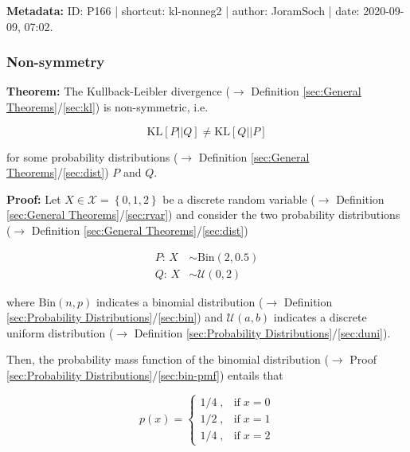 \documentclass[a4paper,12pt,twoside]{book}
\begin{document}
\vspace{1em}
\textbf{Metadata:} ID: P166 | shortcut: kl-nonneg2 | author: JoramSoch | date: 2020-09-09, 07:02.
\vspace{1em}



\subsubsection[\textbf{Non-symmetry}]{Non-symmetry} \label{sec:kl-nonsymm}
\setcounter{equation}{0}

\textbf{Theorem:}  The Kullback-Leibler divergence ($\rightarrow$ Definition \ref{sec:General Theorems}/\ref{sec:kl}) is non-symmetric, i.e.

\begin{equation} \label{eq:kl-nonsymm-KL-nonsymm}
\mathrm{KL}[P||Q] \neq \mathrm{KL}[Q||P]
\end{equation}

for some probability distributions ($\rightarrow$ Definition \ref{sec:General Theorems}/\ref{sec:dist}) $P$ and $Q$.


\vspace{1em}
\textbf{Proof:} Let $X \in \mathcal{X} = \left\lbrace 0, 1, 2 \right\rbrace$ be a discrete random variable ($\rightarrow$ Definition \ref{sec:General Theorems}/\ref{sec:rvar}) and consider the two probability distributions ($\rightarrow$ Definition \ref{sec:General Theorems}/\ref{sec:dist})

\begin{equation} \label{eq:kl-nonsymm-P-Q}
\begin{split}
P : \, X &\sim \mathrm{Bin}(2, 0.5) \\
Q : \, X &\sim \mathcal{U}(0, 2)
\end{split}
\end{equation}

where $\mathrm{Bin}(n, p)$ indicates a binomial distribution ($\rightarrow$ Definition \ref{sec:Probability Distributions}/\ref{sec:bin}) and $\mathcal{U}(a, b)$ indicates a discrete uniform distribution ($\rightarrow$ Definition \ref{sec:Probability Distributions}/\ref{sec:duni}).

Then, the probability mass function of the binomial distribution ($\rightarrow$ Proof \ref{sec:Probability Distributions}/\ref{sec:bin-pmf}) entails that

\begin{equation} \label{eq:kl-nonsymm-p(x)}
p(x) = \left\{
\begin{array}{rl}
1/4 \; , & \text{if} \; x = 0 \\
1/2 \; , & \text{if} \; x = 1 \\
1/4 \; , & \text{if} \; x = 2
\end{array}
\right.
\end{equation}
\end{document}
